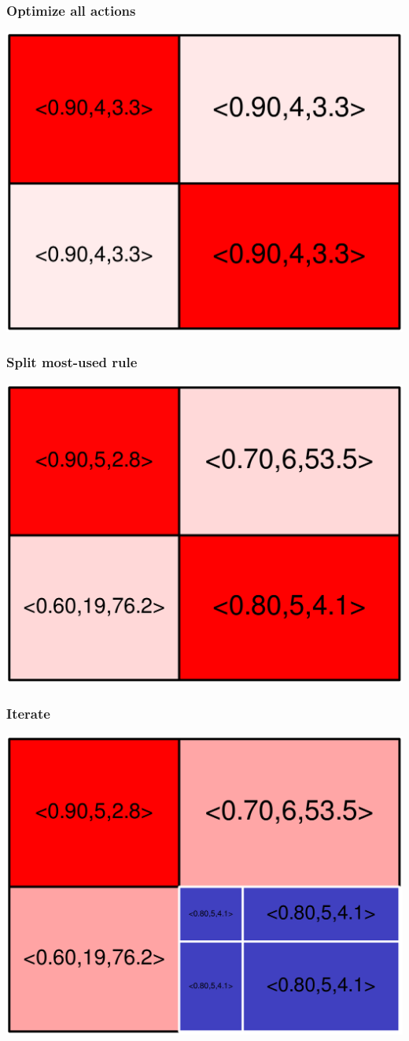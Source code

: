 \begin{frame}
\frametitle{Optimize all actions}
\begin{centering}
\includegraphics[width=8.5 cm]{remy-graph/graph/test3.pdf}

\end{centering}
\end{frame}

\begin{frame}
\frametitle{Split most-used rule}
\begin{centering}
\includegraphics[width=8.5 cm]{remy-graph/graph/test4.pdf}

\end{centering}
\end{frame}

\begin{frame}
\frametitle{Iterate}
\begin{centering}
\includegraphics[width=8.5 cm]{remy-graph/graph/test5.pdf}

\end{centering}
\end{frame}

